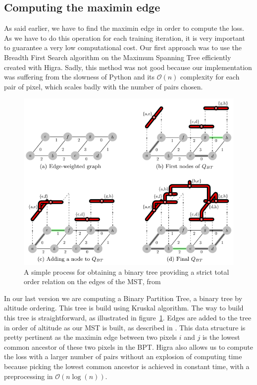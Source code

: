 \subsection{Computing the maximin edge}

As said earlier, we have to find the maximin edge in order to compute the loss.
As we have to do this operation for each training iteration, it is very important to
guarantee a very low computational cost. Our first approach was to use the
Breadth First Search algorithm on the Maximum Spanning Tree efficiently created
with Higra. Sadly, this method was not good because our implementation was
suffering from the slowness of Python and its $\mathcal{O}(n)$ complexity for each pair of
pixel, which scales badly with the number of pairs chosen. \\

\begin{figure}[!htbp]
	\centering
	\includegraphics[width=0.7\linewidth]{./images/bpt.png}
	\caption{A simple process for obtaining a binary tree providing a strict
	total order relation on the edges of the MST, from~\cite{najman_playing_2013}}%
	\label{fig:bpt_method}
\end{figure}


In our last version we are computing a Binary Partition Tree, a binary tree by
altitude ordering. This tree is build using Kruskal algorithm. The way to build
this tree is straightforward, as illustrated in figure~\ref{fig:bpt_method}. 
Edges are added to the tree in order of altitude as our MST is built, as
described in \cite{najman_playing_2013}.
This data structure is pretty pertinent as the
maximin edge between two pixels $i$ and $j$ is the lowest common ancestor of these
two pixels in the BPT. Higra also allows us to compute the loss with a larger
number of pairs without an explosion of computing time because picking the
lowest common ancestor is achieved in constant time, with a preprocessing in
$\mathcal{O}(n\log(n))$.

